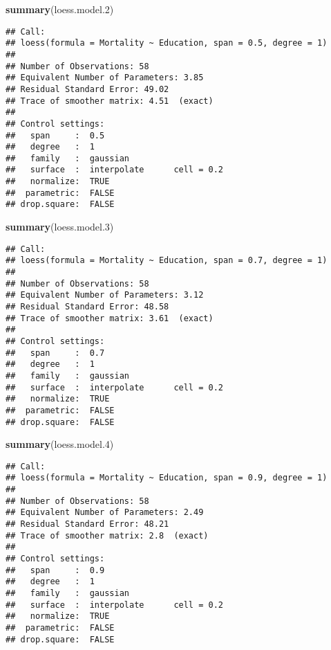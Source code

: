 \documentclass[]{article}
\newenvironment{Shaded}{\begin{snugshade}}{\end{snugshade}}
\newcommand{\KeywordTok}[1]{\textcolor[rgb]{0.13,0.29,0.53}{\textbf{#1}}}
\newcommand{\DecValTok}[1]{\textcolor[rgb]{0.00,0.00,0.81}{#1}}
\newcommand{\NormalTok}[1]{#1}
\begin{document}
\begin{Shaded}
\begin{Highlighting}[]
\KeywordTok{summary}\NormalTok{(loess.model.}\DecValTok{2}\NormalTok{)}
\end{Highlighting}
\end{Shaded}

\begin{verbatim}
## Call:
## loess(formula = Mortality ~ Education, span = 0.5, degree = 1)
## 
## Number of Observations: 58 
## Equivalent Number of Parameters: 3.85 
## Residual Standard Error: 49.02 
## Trace of smoother matrix: 4.51  (exact)
## 
## Control settings:
##   span     :  0.5 
##   degree   :  1 
##   family   :  gaussian
##   surface  :  interpolate      cell = 0.2
##   normalize:  TRUE
##  parametric:  FALSE
## drop.square:  FALSE
\end{verbatim}

\begin{Shaded}
\begin{Highlighting}[]
\KeywordTok{summary}\NormalTok{(loess.model.}\DecValTok{3}\NormalTok{)}
\end{Highlighting}
\end{Shaded}

\begin{verbatim}
## Call:
## loess(formula = Mortality ~ Education, span = 0.7, degree = 1)
## 
## Number of Observations: 58 
## Equivalent Number of Parameters: 3.12 
## Residual Standard Error: 48.58 
## Trace of smoother matrix: 3.61  (exact)
## 
## Control settings:
##   span     :  0.7 
##   degree   :  1 
##   family   :  gaussian
##   surface  :  interpolate      cell = 0.2
##   normalize:  TRUE
##  parametric:  FALSE
## drop.square:  FALSE
\end{verbatim}

\begin{Shaded}
\begin{Highlighting}[]
\KeywordTok{summary}\NormalTok{(loess.model.}\DecValTok{4}\NormalTok{)}
\end{Highlighting}
\end{Shaded}

\begin{verbatim}
## Call:
## loess(formula = Mortality ~ Education, span = 0.9, degree = 1)
## 
## Number of Observations: 58 
## Equivalent Number of Parameters: 2.49 
## Residual Standard Error: 48.21 
## Trace of smoother matrix: 2.8  (exact)
## 
## Control settings:
##   span     :  0.9 
##   degree   :  1 
##   family   :  gaussian
##   surface  :  interpolate      cell = 0.2
##   normalize:  TRUE
##  parametric:  FALSE
## drop.square:  FALSE
\end{verbatim}
\end{document}
